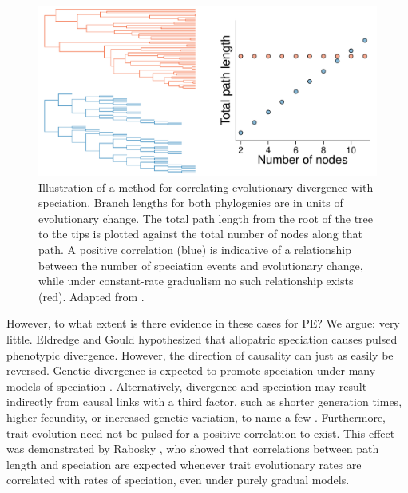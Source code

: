 \begin{figure}[p]
\centering
\includegraphics[width=\textwidth]{figs/Pennell_TREE-fig-box2}
\caption[Correlations between evolutionary divergence and speciation rates]{Illustration of a method for correlating evolutionary divergence with speciation. Branch lengths for both phylogenies are in units of evolutionary change. The total path length from the root of the tree to the tips is plotted against the total number of nodes along that path. A positive correlation (blue) is indicative of a relationship between the number of speciation events and evolutionary change, while under constant-rate gradualism no such relationship exists (red). Adapted from \citep{Pagel2006}.}
\label{fig:pe-box2}
\end{figure} 

However, to what extent is there evidence in these cases for PE? We argue: very little. Eldredge and Gould \citep{EldredgeGould1972} hypothesized that allopatric speciation causes pulsed phenotypic divergence. However, the direction of causality can just as easily be reversed. Genetic divergence is expected to promote speciation under many models of speciation \citep{Nosil2012}. Alternatively, divergence and speciation may result indirectly from causal links with a third factor, such as shorter generation times, higher fecundity, or increased genetic variation, to name a few \citep{Goldie2011}. Furthermore, trait evolution need not be pulsed for a positive correlation to exist. This effect was demonstrated by Rabosky \citep{Rabosky2012}, who showed that correlations between path length and speciation are expected whenever trait evolutionary rates are correlated with rates of speciation, even under purely gradual models. 

